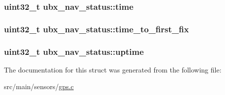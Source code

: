 \hypertarget{structubx__nav__status_ae9835aa0b5e74605822d52593c9580f1}{
\subsubsection[{time}]{\setlength{\rightskip}{0pt plus 5cm}uint32\+\_\+t ubx\+\_\+nav\+\_\+status\+::time}}\label{structubx__nav__status_ae9835aa0b5e74605822d52593c9580f1}
\hypertarget{structubx__nav__status_a3ce968ea00ae717540935722a271618e}{
\subsubsection[{time\+\_\+to\+\_\+first\+\_\+fix}]{\setlength{\rightskip}{0pt plus 5cm}uint32\+\_\+t ubx\+\_\+nav\+\_\+status\+::time\+\_\+to\+\_\+first\+\_\+fix}}\label{structubx__nav__status_a3ce968ea00ae717540935722a271618e}
\hypertarget{structubx__nav__status_ad9313e15a9652678859646360f0dae5a}{
\subsubsection[{uptime}]{\setlength{\rightskip}{0pt plus 5cm}uint32\+\_\+t ubx\+\_\+nav\+\_\+status\+::uptime}}\label{structubx__nav__status_ad9313e15a9652678859646360f0dae5a}


The documentation for this struct was generated from the following file\+:\begin{DoxyCompactItemize}
\item 
src/main/sensors/\hyperlink{gps_8c}{gps.\+c}\end{DoxyCompactItemize}
